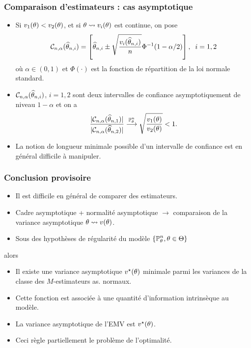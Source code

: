 \begin{frame}
\frametitle{Comparaison d'estimateurs : cas asymptotique}
\begin{itemize}
\item Si $v_1(\theta) < v_2(\theta)$, et si $\theta \leadsto v_i(\theta)$ est continue, on pose
$${\mathcal C}_{n,\alpha}(\widehat {\theta}_{n,i}) = \left[\widehat {\theta}_{n,i}\pm\sqrt{\frac{v_i(\widehat {\theta}_{n,i})}{n}}\Phi^{-1}(1-\alpha/2)\right],\;\;i=1,2$$
où $\alpha \in (0,1)$ et $\Phi(\cdot)$ est la fonction de répartition de la loi normale standard.
\item ${\mathcal C}_{n,\alpha}(\widehat {\theta}_{n,i})$, $i=1,2$ sont deux \alert{intervalles de confiance asymptotiquement de niveau $1-\alpha$} et on a
$$\frac{|{\mathcal C}_{n,\alpha}(\widehat {\theta}_{n,1})|}{|{\mathcal C}_{n,\alpha}(\widehat {\theta}_{n,2})|} \stackrel{\operatorname{{\mathbb P}}_\theta^n}{\longrightarrow} \sqrt{\frac{v_1(\theta)}{v_2(\theta)}}<1.$$
\item La notion de \alert{ longueur minimale possible d'un intervalle de confiance} est en général difficile à manipuler.
\end{itemize}
\end{frame}



\begin{frame}
\frametitle{Conclusion provisoire}
\begin{itemize}
\item Il est \alert{difficile en général} de comparer des estimateurs.
\item Cadre asymptotique + normalité asymptotique $\rightarrow$ comparaison de la \alert{variance asymptotique} $\theta \leadsto v(\theta)$.
\item Sous des hypothèses de
régularité du modèle $\{\operatorname{{\mathbb P}}_\theta^n, \theta \in \Theta\}$
\end{itemize}
alors
\begin{itemize}
\item Il \alert{existe} une variance asymptotique $v^\star(\theta)$ \alert{minimale} parmi les variances de la classe des $M$-estimateurs as. normaux.
\item Cette fonction est associée à une \alert{quantité d'information intrinsèque} au modèle.
\item La variance asymptotique de l'\alert{EMV} est $v^\star(\theta)$.
\item Ceci règle \alert{partiellement} le problème de l'optimalité.
\end{itemize}
\end{frame}


